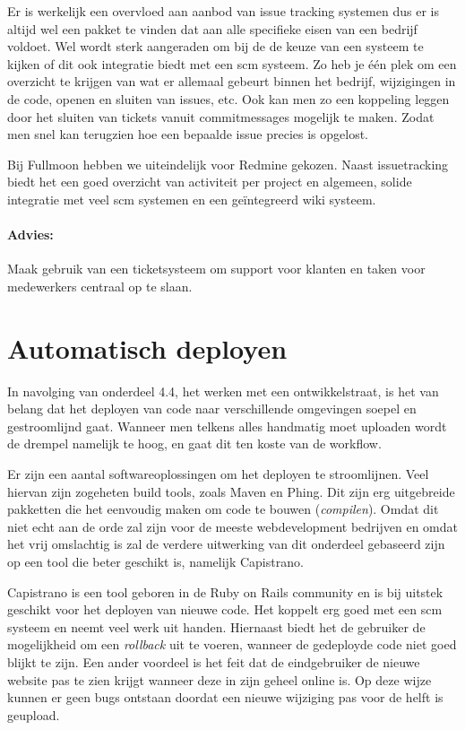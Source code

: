 Er is werkelijk een overvloed aan aanbod van issue tracking systemen\cite{issuetracking} dus er is altijd wel een pakket te vinden dat aan alle specifieke eisen van een bedrijf voldoet. Wel wordt sterk aangeraden om bij de de keuze van een systeem te kijken of dit ook integratie biedt met een {\sc scm} systeem. Zo heb je één plek om een overzicht te krijgen van wat er allemaal gebeurt binnen het bedrijf, wijzigingen in de code, openen en sluiten van issues, etc. Ook kan men zo een koppeling leggen door het sluiten van tickets vanuit commitmessages mogelijk te maken. Zodat men snel kan terugzien hoe een bepaalde issue precies is opgelost.

Bij Fullmoon hebben we uiteindelijk voor Redmine\cite{redmine} gekozen. Naast issuetracking biedt het een goed overzicht van activiteit per project en algemeen, solide integratie met veel {\sc scm} systemen en een geïntegreerd wiki systeem.

\paragraph{Advies:} Maak gebruik van een ticketsysteem om support voor klanten en taken voor medewerkers centraal op te slaan. 

\section{Automatisch deployen}

In navolging van onderdeel 4.4, het werken met een ontwikkelstraat, is het van belang dat het deployen van code naar verschillende omgevingen soepel en gestroomlijnd gaat. Wanneer men telkens alles handmatig moet uploaden wordt de drempel namelijk te hoog, en gaat dit ten koste van de workflow.

Er zijn een aantal softwareoplossingen om het deployen te stroomlijnen. Veel hiervan zijn zogeheten build tools, zoals Maven\cite{maven} en Phing\cite{phing}. Dit zijn erg uitgebreide pakketten die het eenvoudig maken om code te bouwen (\emph{compilen}). Omdat dit niet echt aan de orde zal zijn voor de meeste webdevelopment bedrijven en omdat het vrij omslachtig is zal de verdere uitwerking van dit onderdeel gebaseerd zijn op een tool die beter geschikt is, namelijk Capistrano\cite{capistrano}.

Capistrano is een tool geboren in de Ruby on Rails community en is bij uitstek geschikt voor het deployen van nieuwe code. Het koppelt erg goed met een {\sc scm} systeem en neemt veel werk uit handen. Hiernaast biedt het de gebruiker de mogelijkheid om een \emph{rollback} uit te voeren, wanneer de gedeployde code niet goed blijkt te zijn. Een ander voordeel is het feit dat de eindgebruiker de nieuwe website pas te zien krijgt wanneer deze in zijn geheel online is. Op deze wijze kunnen er geen bugs ontstaan doordat een nieuwe wijziging pas voor de helft is geupload.

